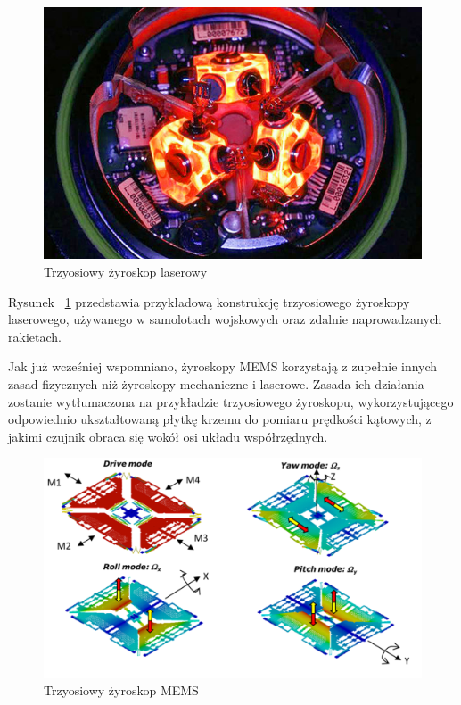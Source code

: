 \begin{figure}[H]
	\centering
	\includegraphics[scale=0.4]{Pictures/3d_laser_ring_gyro.jpg}
        \caption[Trzyosiowy żyroskop laserowy]{Trzyosiowy żyroskop laserowy~\cite{mems7}}
        \label{fig:3d_laser_ring_gyro}
\end{figure}

Rysunek ~\ref{fig:3d_laser_ring_gyro} przedstawia przykładową konstrukcję trzyosiowego żyroskopy laserowego, używanego w samolotach wojskowych oraz zdalnie naprowadzanych rakietach. 

Jak już wcześniej wspomniano, żyroskopy MEMS korzystają z zupełnie innych zasad fizycznych niż żyroskopy mechaniczne i laserowe. Zasada ich działania zostanie wytłumaczona na przykładzie trzyosiowego żyroskopu, wykorzystującego odpowiednio ukształtowaną płytkę krzemu do pomiaru prędkości kątowych, z jakimi czujnik obraca się wokół osi układu współrzędnych.

\begin{figure}[H]
	\centering
	\includegraphics[scale=0.4]{Pictures/3d_gyro.png}
        \caption[Trzyosiowy żyroskop MEMS]{Trzyosiowy żyroskop MEMS~\cite{mems6}}
        \label{fig:3d_gyro}
\end{figure}


